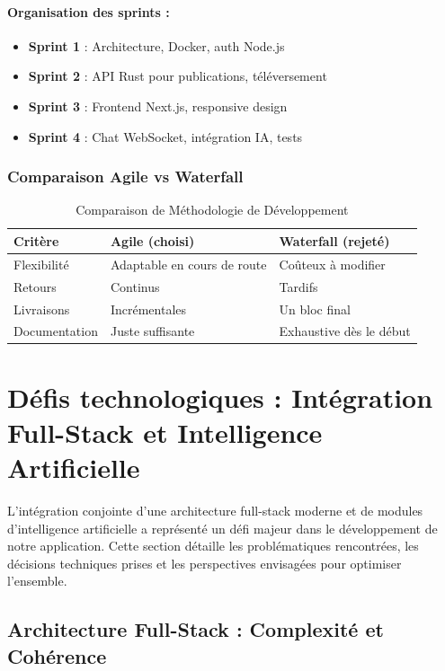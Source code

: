\documentclass[12pt]{rapportPfe}
\begin{document}
\paragraph{Organisation des sprints :}
\begin{itemize}
    \item \textbf{Sprint 1} : Architecture, Docker, auth Node.js
    \item \textbf{Sprint 2} : API Rust pour publications, téléversement
    \item \textbf{Sprint 3} : Frontend Next.js, responsive design
    \item \textbf{Sprint 4} : Chat WebSocket, intégration IA, tests
\end{itemize}

\subsubsection{Comparaison Agile vs Waterfall}
\begin{table}[ht]
\centering
\begin{tabular}{|l|l|l|}
\hline
\textbf{Critère} & \textbf{Agile (choisi)} & \textbf{Waterfall (rejeté)} \\
\hline
Flexibilité & Adaptable en cours de route & Coûteux à modifier \\
\hline
Retours & Continus & Tardifs \\
\hline
Livraisons & Incrémentales & Un bloc final \\
\hline
Documentation & Juste suffisante & Exhaustive dès le début \\
\hline
\end{tabular}
\caption{Comparaison de Méthodologie de Développement}
\label{tab:compare-meth}
\end{table}

\section{Défis technologiques : Intégration Full-Stack et Intelligence Artificielle}

L’intégration conjointe d’une architecture full-stack moderne et de modules d’intelligence artificielle a représenté un défi majeur dans le développement de notre application. Cette section détaille les problématiques rencontrées, les décisions techniques prises et les perspectives envisagées pour optimiser l’ensemble.

\subsection{Architecture Full-Stack : Complexité et Cohérence}
\end{document}
